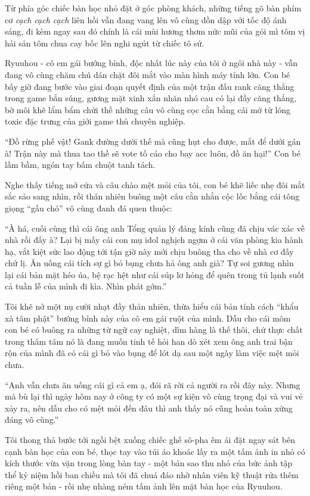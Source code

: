 \documentclass[../main.tex]{subfiles}
\begin{document}
Từ phía góc chiếc bàn học nhỏ đặt ở góc phòng khách, những tiếng gõ bàn phím cơ \textit{cạch cạch cạch} liên hồi vẫn đang vang lên vô cùng dồn dập với tốc độ ánh sáng, đi kèm ngay sau đó chính là cái mùi hương thơm nức mũi của gói mì tôm vị hải sản tôm chua cay bốc lên nghi ngút từ chiếc tô sứ.

Ryuuhou - cô em gái bướng bỉnh, độc nhất lúc này của tôi ở ngôi nhà này - vẫn đang vô cùng chăm chú dán chặt đôi mắt vào màn hình máy tính lớn. Con bé bấy giờ đang bước vào giai đoạn quyết định của một trận đấu rank căng thẳng trong game bắn súng, gương mặt xinh xắn nhăn nhó cau có lại đầy căng thẳng, bờ môi khẽ lẩm bẩm chửi thề những câu vô cùng cọc cằn bằng cái mớ từ lóng toxic đặc trưng của giới game thủ chuyên nghiệp.

``Đồ rừng phế vật! Gank đường dưới thế mà cũng hụt cho được, mắt để dưới gán à! Trận này mà thua tao thề sẽ vote tố cáo cho bay acc luôn, đồ ăn hại!'' Con bé lầm bầm, ngón tay bấm chuột tanh tách.

Nghe thấy tiếng mở cửa và câu chào mệt mỏi của tôi, con bé khẽ liếc nhẹ đôi mắt sắc sảo sang nhìn, rồi thản nhiên buông một câu cằn nhằn cộc lốc bằng cái tông giọng ``gấu chó'' vô cùng đanh đá quen thuộc:

``À há, cuối cùng thì cái ông anh Tổng quản lý đáng kính cũng đã chịu vác xác về nhà rồi đấy à? Lại bị mấy cái con mụ idol nghịch ngợm ở cái văn phòng kia hành hạ, vắt kiệt sức lao động tới tận giờ này mới chịu buông tha cho về nhà cơ đấy chứ lị. Ăn uống cái tích sự gì bỏ bụng chưa hả ông anh già? Tự soi gương nhìn lại cái bản mặt héo úa, bệ rạc hệt như cái súp lơ hỏng để quên trong tủ lạnh suốt cả tuần lễ của mình đi kìa. Nhìn phát gớm.''

Tôi khẽ nở một nụ cười nhạt đầy thản nhiên, thừa hiểu cái bản tính cách ``khẩu xà tâm phật'' bướng bỉnh này của cô em gái ruột của mình. Dẫu cho cái mõm con bé có buông ra những từ ngữ cay nghiệt, dìm hàng là thế thôi, chứ thực chất trong thâm tâm nó là đang muốn tinh tế hỏi han dò xét xem ông anh trai bận rộn của mình đã có cái gì bỏ vào bụng để lót dạ sau một ngày làm việc mệt mỏi chưa.

``Anh vẫn chưa ăn uống cái gì cả em ạ, đói rã rời cả người ra rồi đây này. Nhưng mà bù lại thì ngày hôm nay ở công ty có một sự kiện vô cùng trọng đại và vui vẻ xảy ra, nên dẫu cho có mệt mỏi đến đâu thì anh thấy nó cũng hoàn toàn xứng đáng vô cùng.''

Tôi thong thả bước tới ngồi bệt xuống chiếc ghế sô-pha êm ái đặt ngay sát bên cạnh bàn học của con bé, thọc tay vào túi áo khoác lấy ra một tấm ảnh in nhỏ có kích thước vừa vặn trong lòng bàn tay - một bản sao thu nhỏ của bức ảnh tập thể kỷ niệm hồi ban chiều mà tôi đã chuá đáo nhờ nhân viên kỹ thuật rửa thêm riêng một bản - rồi nhẹ nhàng ném tấm ảnh lên mặt bàn học của Ryuuhou.
\end{document}
